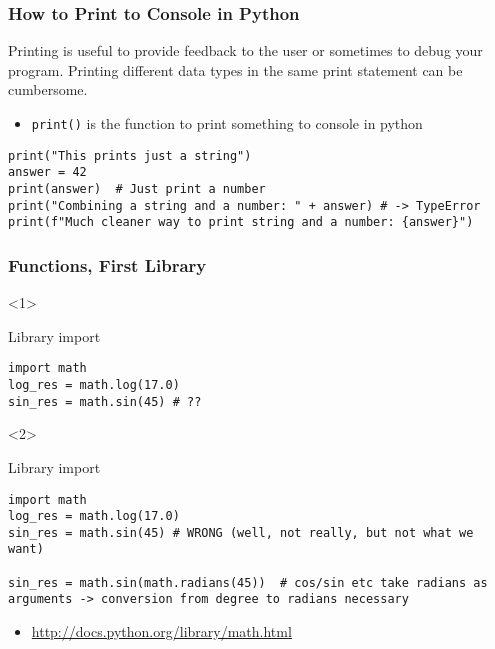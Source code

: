 \documentclass[10pt, a4paper]{beamer} %
\begin{document}
\begin{frame}[c, fragile]\frametitle{How to Print to Console in Python}
	Printing is useful to provide feedback to the user or sometimes to debug your program. Printing different data types
	in the same print statement can be cumbersome.
	\begin{itemize}
		\item \texttt{print()} is the function to print something to console in python
	\end{itemize}

	\begin{lstlisting}
print("This prints just a string")
answer = 42
print(answer)  # Just print a number
print("Combining a string and a number: " + answer) # -> TypeError
print(f"Much cleaner way to print string and a number: {answer}")
\end{lstlisting}
\end{frame}

\begin{frame}[t, fragile]\frametitle{Functions, First Library}
	\begin{onlyenv}
		\begin{block}{Library import}
			\begin{lstlisting}
import math
log_res = math.log(17.0)
sin_res = math.sin(45) # ??
  \end{lstlisting}
		\end{block}
	\end{onlyenv}

	\begin{onlyenv}
		\begin{block}{Library import}
			\begin{lstlisting}
import math
log_res = math.log(17.0)
sin_res = math.sin(45) # WRONG (well, not really, but not what we want)

sin_res = math.sin(math.radians(45))  # cos/sin etc take radians as arguments -> conversion from degree to radians necessary
  \end{lstlisting}
		\end{block}
	\end{onlyenv}

	\begin{itemize}
		\item \tiny \url{http://docs.python.org/library/math.html}
	\end{itemize}
\end{frame}
\end{document}
